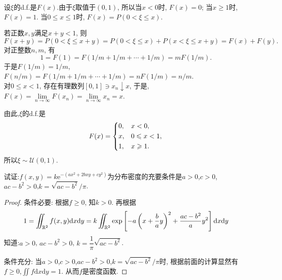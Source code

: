\begin{yyProof}
	设$\xi$的d.f.是$F(x)$.由于$\xi$取值于$(0,1)$, 所以当$x<0$时, $F(x) = 0$; 当$x\geqslant 1$时, $F(x) = 1$. 
	当$0\leqslant x\leqslant1$时, $F(x) = P(0<\xi\leqslant x)$.
	
	若正数$x,y$满足$x+y<1$, 则\begin{equation}F(x+y) = P(0<\xi\leqslant x+y) = P(0<\xi\leqslant x) + P(x<\xi\leqslant x+y) = F(x)+F(y).\end{equation}
	对正整数$n,m$, 有
	\begin{equation}
		1 = F(1) = F(1/m + 1/m + \cdots + 1/m) = mF(1/m).
	\end{equation}
	于是$F(1/m) = 1/m$, $F(n/m) = F(1/m + 1/m + \cdots + 1/m) = nF(1/m) = n/m$. \\对$0\leqslant x<1$, 存在有理数列$[0,1]\ni x_n\downarrow x$, 于是, $F(x) = \lim\limits_{n\to\infty}F(x_n) = \lim\limits_{n\to\infty}x_n = x$.
	
	由此,$\xi$的d.f.是\begin{equation}
		F(x) = \begin{dcases}
			0, &x<0,\\
			x, &0\leqslant x<1,\\
			1, &x\geqslant 1.
		\end{dcases}
	\end{equation}
	所以$\xi\sim\mathcal{U}(0,1)$.
\end{yyProof}

\begin{yyEx}
	试证:$f(x,y) = k\mathrm{e}^{-(ax^2+2bxy+cy^2)}$为分布密度的充要条件是$a>0$,$c>0$,$ac-b^2>0$,$k=\sqrt{ac-b^2}/\pi$.
\end{yyEx}

\begin{proof}
	条件必要: 根据$f\geqslant 0$, 知$k>0$.
	再根据\begin{equation}
		1 = \iint_{\mathbb{R}^2}f(x,y)\mathrm{d}x\mathrm{d}y = k\iint_{\mathbb{R}^2}
		\exp\left[ -a\left(x+\frac{b}{a}y\right)^2+\frac{ac-b^2}{a}y^2\right]\mathrm{d}x\mathrm{d}y\\
		\end{equation}
	知道:$a>0$, $ac-b^2>0$, $k = \dfrac{1}{\pi}\sqrt{ac-b^2}$.
	
	条件充分: 当$a>0$,$c>0$,$ac-b^2>0$,$k=\sqrt{ac-b^2}/\pi$时, 根据前面的计算显然有$f\geqslant 0$,$\iint f \mathrm{d}x\mathrm{d}y= 1$. 从而$f$是密度函数.
\end{proof}

